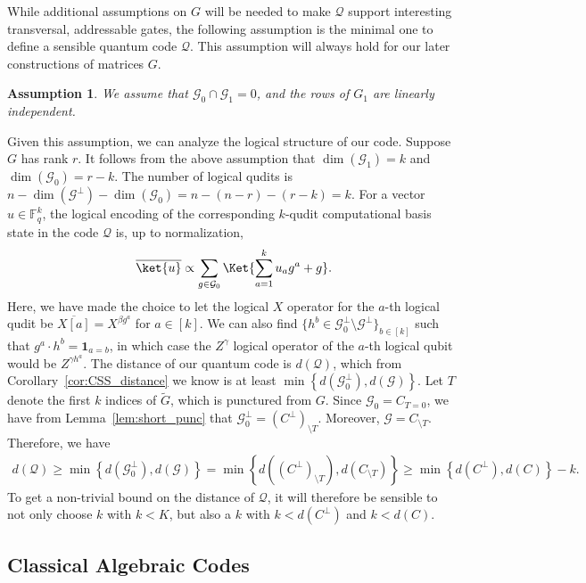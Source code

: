 \documentclass[11pt]{article}
\newtheorem{assumption}[theorem]{Assumption}
\theoremstyle{definition}
\renewcommand{\ge}{\geqslant}
\newcommand{\cG}{\mathcal{G}}
\newcommand{\sm}{\setminus}
\newcommand{\one}{\boldsymbol{1}}
\newcommand{\qcode}{\mathcal{Q}}
\newcommand{\FF}{\mathbb{F}}
\newcommand*{\ol}{\overline}
\newcommand{\punc}[2]{#1_{\sm #2}}
\newcommand{\puncT}[1]{\punc{#1}{T}}
\newcommand{\shrT}[1]{#1_{T = 0}}
\begin{document}
While additional assumptions on $G$ will be needed to make $\qcode$ support interesting transversal, addressable gates, the following assumption is the minimal one to define a sensible quantum code $\qcode$. This assumption will always hold for our later constructions of matrices $G$.
\begin{assumption}\label{assump:independence}
    We assume that $\cG_0\cap \cG_1 = 0$, and the rows of $G_1$ are linearly independent.
\end{assumption}
Given this assumption, we can analyze the logical structure of our code.
Suppose $G$ has rank $r$. 
It follows from the above assumption that $\dim(\cG_1) = k$ and $\dim(\cG_0) = r-k$.
The number of logical qudits is $n - \dim(\cG^\perp) - \dim(\cG_0) = n - (n-r) - (r-k) = k$. 
For a vector $u\in \FF_q^k$, the logical encoding of the corresponding $k$-qudit computational basis state in the code $\qcode$ is, up to normalization,
\begin{align}~\label{eq:logical_state}
    \ol{\ket{u}} \propto \sum_{g\in \cG_0} \Ket{\sum_{a=1}^k u_ag^a + g}. 
\end{align}
Here, we have made the choice to let the logical $X$ operator for the $a$-th logical qudit be $\overline{X[a]} = X^{\beta g^a}$ for $a \in [k]$.
We can also find $\{ h^b\in \cG_0^\perp\setminus\cG^\perp \}_{b \in [k]}$ such that $g^a\cdot h^b = \one_{a=b}$, in which case
the $Z^\gamma$ logical operator of the $a$-th logical qubit would be $Z^{\gamma h^a}$.
The distance of our quantum code is $d(\qcode)$, which from Corollary~\ref{cor:CSS_distance} we know is at least $\min\left\{d(\cG_0^\perp), d(\cG)\right\}$. 
Let $T$ denote the first $k$ indices of $\tilde G$, which is punctured from $G$.
Since $\cG_0 = \shrT{C}$, we have from Lemma~\ref{lem:short_punc} that $\cG_0^\perp = \puncT{(C^\perp)}$. 
Moreover, $\cG = \puncT{C}$.
Therefore, we have
\begin{align}\label{eq:dist_qcode}
    d(\qcode) \ge \min\left\{d(\mathcal{G}_0^\perp),d(\mathcal{G})\right\}=\min\left\{d(\puncT{(C^\perp)}), d(\puncT{C})\right\} \ge \min\left\{d(C^\perp), d(C)\right\}-k. 
\end{align}
To get a non-trivial bound on the distance of $\mathcal{Q}$, it will therefore be sensible to not only choose $k$ with $k < K$, but also a $k$ with $k < d(C^\perp)$ and $k < d(C)$.


\subsection{Classical Algebraic Codes}
\end{document}
